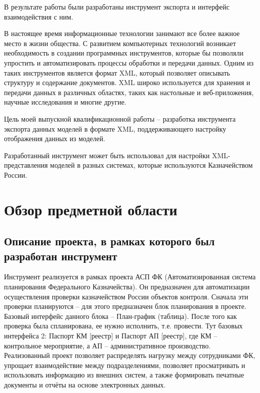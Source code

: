 \documentclass[a4paper,12pt]{diplom}
\begin{document}
В результате работы были разработаны инструмент экспорта и интерфейс взаимодействия с ним.

\medskip

\tableofcontents[Содержание]


В настоящее время информационные технологии занимают все более важное место в жизни общества. С развитием компьютерных технологий возникает необходимость в создании программных инструментов, которые бы позволяли упростить и автоматизировать процессы обработки и передачи данных. Одним из таких инструментов является формат XML, который позволяет описывать структуру и содержание документов. XML широко используется для хранения и передачи данных в различных областях, таких как настольные и веб-приложения, научные исследования и многие другие.

Цель моей выпускной квалификационной работы -- разработка инструмента экспорта данных моделей в формате XML, поддерживающего настройку отображения данных из моделей.

Разработанный инструмент может быть использовал для настройки XML-представления моделей в разных системах, которые используются Казначейством России.

\chapter{Обзор предметной области}

\section{Описание проекта, в рамках которого был разработан инструмент}

Инструмент реализуется в рамках проекта АСП ФК (Автоматизированная система планирования Федерального Казначейства). Он предназначен для автоматизации осуществления проверки казначейством России объектов контроля. Сначала эти проверки планируются -- для этого предназначен блок планирования в проекте. Базовый интерфейс данного блока -- План-график (таблица). После того как проверка была спланирована, ее нужно исполнить, т.е. провести. Тут базовых интерфейса 2: Паспорт КМ [реестр] и Паспорт АП [реестр], где КМ -- контрольное мероприятие, а АП -- административное производство. Реализованный проект позволяет распределять нагрузку между сотрудниками ФК, упрощает взаимодействие между подразделениями, позволяет просматривать и использовать информацию из внешних систем, а также формировать печатные документы и отчёты на основе электронных данных.
\end{document}
